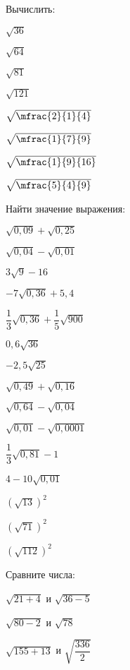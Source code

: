 \begin{homework}[number=1]
	\begin{listofex}
		\item Вычислить:
		\begin{enumcols}[itemcolumns=4]
				\item \( \sqrt{36} \)
				\item \( \sqrt{64} \)
				\item \( \sqrt{81} \)
				\item \( \sqrt{121} \)
				\item \( \sqrt{\mfrac{2}{1}{4}} \)
				\item \( \sqrt{\mfrac{1}{7}{9}} \)
				\item \( \sqrt{\mfrac{1}{9}{16}} \)
				\item \( \sqrt{\mfrac{5}{4}{9}} \)
		\end{enumcols}
		\item Найти значение выражения:
		\begin{enumcols}[itemcolumns=4]
			\item \( \sqrt{0,09}+\sqrt{0,25}\)
			\item \( \sqrt{0,04}-\sqrt{0,01}\)
			\item \( 3\sqrt{9}-16\)
			\item \( -7\sqrt{0,36}+5,4\)
			\item \( \dfrac{1}{3}\sqrt{0,36}+\dfrac{1}{5}\sqrt{900}\)
			\item \( 0,6\sqrt{36} \)
			\item \( -2,5\sqrt{25} \)
			\item \( \sqrt{0,49}+\sqrt{0,16} \)
			\item \( \sqrt{0,64}-\sqrt{0,04} \)
			\item \( \sqrt{0,01}-\sqrt{0,0001} \)
			\item \( \dfrac{1}{3}\sqrt{0,81}-1 \)
			\item \( 4-10\sqrt{0,01} \)
			\item \( (\sqrt{13})^2 \)
			\item \( (\sqrt{71})^2 \)
			\item \( (\sqrt{112})^2 \)
		\end{enumcols}
		\item Сравните числа: 
		\begin{enumcols}[itemcolumns=2]
			\item \( \sqrt{21+4} \) и \( \sqrt{36-5} \)
			\item \( \sqrt{80-2} \) и \( \sqrt{78} \)
			\item \( \sqrt{155+13} \) и \( \sqrt{\dfrac{336}{2}} \)

\end{enumcols}
\end{listofex}
\end{homework}
